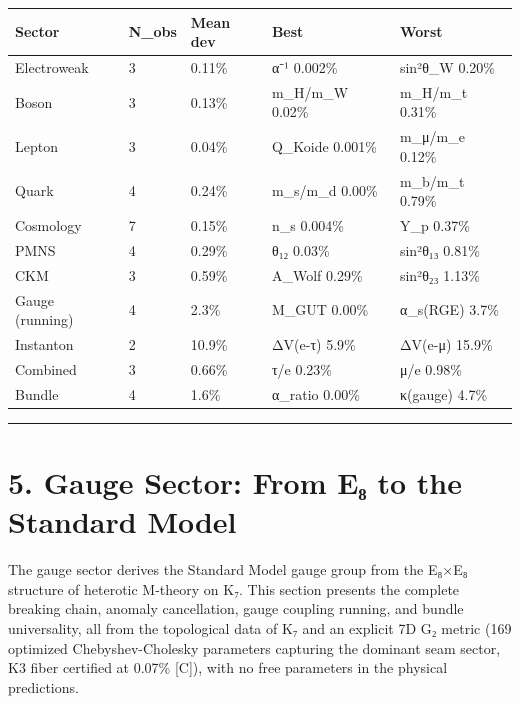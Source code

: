 \documentclass[11pt,a4paper]{article}
\begin{document}
\begin{longtable}[]{@{}lllll@{}}
\toprule\noalign{}
Sector & N\_\allowbreak{}obs & Mean dev & Best & Worst \\
\midrule\noalign{}
\endhead
\bottomrule\noalign{}
\endlastfoot
Electroweak & 3 & 0.11\% & α⁻¹ 0.002\% & sin²θ\_\allowbreak{}W 0.20\% \\
Boson & 3 & 0.13\% & m\_\allowbreak{}H/m\_\allowbreak{}W 0.02\% & m\_\allowbreak{}H/m\_\allowbreak{}t 0.31\% \\
Lepton & 3 & 0.04\% & Q\_\allowbreak{}Koide 0.001\% & m\_\allowbreak{}μ/m\_\allowbreak{}e 0.12\% \\
Quark & 4 & 0.24\% & m\_\allowbreak{}s/m\_\allowbreak{}d 0.00\% & m\_\allowbreak{}b/m\_\allowbreak{}t 0.79\% \\
Cosmology & 7 & 0.15\% & n\_\allowbreak{}s 0.004\% & Y\_\allowbreak{}p 0.37\% \\
PMNS & 4 & 0.29\% & θ₁₂ 0.03\% & sin²θ₁₃ 0.81\% \\
CKM & 3 & 0.59\% & A\_\allowbreak{}Wolf 0.29\% & sin²θ₂₃ 1.13\% \\
Gauge (running) & 4 & 2.3\% & M\_\allowbreak{}GUT 0.00\% & α\_\allowbreak{}s(RGE) 3.7\% \\
Instanton & 2 & 10.9\% & ΔV(e-τ) 5.9\% & ΔV(e-μ) 15.9\% \\
Combined & 3 & 0.66\% & τ/e 0.23\% & μ/e 0.98\% \\
Bundle & 4 & 1.6\% & α\_\allowbreak{}ratio 0.00\% & κ(gauge) 4.7\% \\
\end{longtable}

\begin{center}\rule{\linewidth}{0.5pt}\end{center}

\section{5. Gauge Sector: From E₈ to the Standard Model}\label{gauge-sector-from-eux2088-to-the-standard-model}

The gauge sector derives the Standard Model gauge group from the E₈×E₈ structure of heterotic M-theory on K₇. This section presents the complete breaking chain, anomaly cancellation, gauge coupling running, and bundle universality, all from the topological data of K₇ and an explicit 7D G₂ metric (169 optimized Chebyshev-Cholesky parameters capturing the dominant seam sector, K3 fiber certified at 0.07\% {[}C{]}), with no free parameters in the physical predictions.
\end{document}
